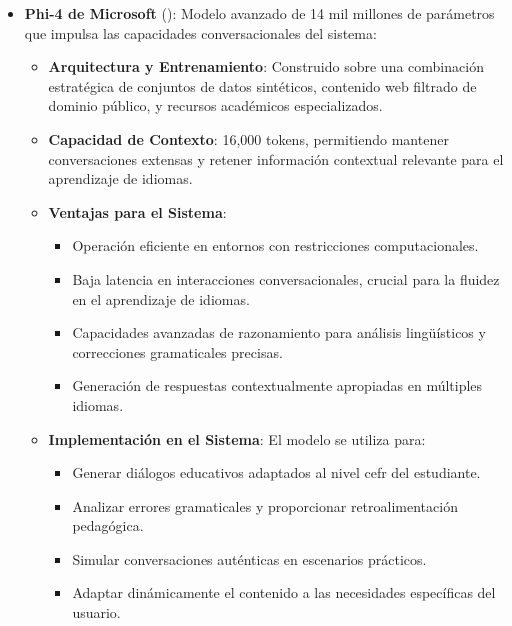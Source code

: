 \begin{itemize}
	\item \textbf{Phi-4 de Microsoft} (\cite{abdin2024phi4technicalreport}): Modelo avanzado de 14 mil millones de parámetros que impulsa las capacidades conversacionales del sistema:
		  \begin{itemize}
			  \item \textbf{Arquitectura y Entrenamiento}: Construido sobre una combinación estratégica de conjuntos de datos sintéticos, contenido web filtrado de dominio público, y recursos académicos especializados.
			  \item \textbf{Capacidad de Contexto}: 16,000 tokens, permitiendo mantener conversaciones extensas y retener información contextual relevante para el aprendizaje de idiomas.
			  \item \textbf{Ventajas para el Sistema}:
					\begin{itemize}
						\item Operación eficiente en entornos con restricciones computacionales.
						\item Baja latencia en interacciones conversacionales, crucial para la fluidez en el aprendizaje de idiomas.
						\item Capacidades avanzadas de razonamiento para análisis lingüísticos y correcciones gramaticales precisas.
						\item Generación de respuestas contextualmente apropiadas en múltiples idiomas.
					\end{itemize}
			  \item \textbf{Implementación en el Sistema}: El modelo se utiliza para:
					\begin{itemize}
						\item Generar diálogos educativos adaptados al nivel \gls{cefr} del estudiante.
						\item Analizar errores gramaticales y proporcionar retroalimentación pedagógica.
						\item Simular conversaciones auténticas en escenarios prácticos.
						\item Adaptar dinámicamente el contenido a las necesidades específicas del usuario.
					\end{itemize}
		  \end{itemize}


\end{itemize}
